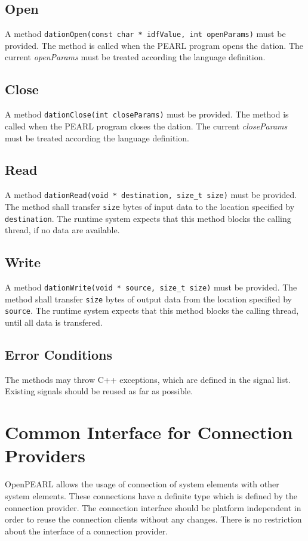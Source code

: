 \subsection{Open}
A method \verb|dationOpen(const char * idfValue, int openParams)|
must be provided.
The method is called when the PEARL program opens the dation.
The current {\em openParams} must be treated according the language definition.

\subsection{Close}
A method \verb|dationClose(int closeParams)|
must be provided.
The method is called when the PEARL program closes the dation.
The current {\em closeParams} must be treated according the language 
definition.

\subsection{Read}
A method \verb|dationRead(void * destination, size_t size)|
must be provided. The method shall transfer \verb|size| bytes of
input data to the location specified by \verb|destination|.
The runtime system expects that this method blocks the calling thread,
if no data are available. 

\subsection{Write}
A method \verb|dationWrite(void * source, size_t size)|
must be provided. The method shall transfer \verb|size| bytes of
output data from the location specified by \verb|source|.
The runtime system expects that this method blocks the calling thread,
until all data is transfered.

\subsection{Error Conditions}
The methods may throw C++ exceptions, which are defined in the signal list.
Existing signals should be reused as far as possible.

\section{Common Interface for Connection Providers}
OpenPEARL allows the usage of connection of system elements  with other 
system elements. These connections have a definite type which is defined
by the connection provider.
The connection interface should be platform independent in order to reuse
the connection clients without any changes. 
There is no restriction about the interface of a connection provider.  

